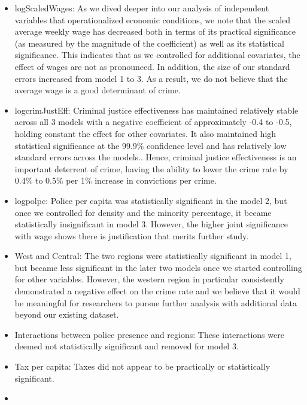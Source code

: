 \documentclass[]{article}
\providecommand{\tightlist}{%
  \setlength{\itemsep}{0pt}\setlength{\parskip}{0pt}}
\begin{document}
\begin{itemize}
\tightlist
\item
  logScaledWages: As we dived deeper into our analysis of independent
  variables that operationalized economic conditions, we note that the
  scaled average weekly wage has decreased both in terms of its
  practical significance (as measured by the magnitude of the
  coefficient) as well as its statistical significance. This indicates
  that as we controlled for additional covariates, the effect of wages
  are not as pronounced. In addition, the size of our standard errors
  increased from model 1 to 3. As a result, we do not believe that the
  average wage is a good determinant of crime.\\
\item
  logcrimJustEff: Criminal justice effectiveness has maintained
  relatively stable across all 3 models with a negative coefficient of
  approximately -0.4 to -0.5, holding constant the effect for other
  covariates. It also maintained high statistical significance at the
  99.9\% confidence level and has relatively low standard errors across
  the models.. Hence, criminal justice effectiveness is an important
  deterrent of crime, having the ability to lower the crime rate by
  0.4\% to 0.5\% per 1\% increase in convictions per crime.\\
\item
  logpolpc: Police per capita was statistically significant in the model
  2, but once we controlled for density and the minority percentage, it
  became statistically insignificant in model 3. However, the higher
  joint significance with wage shows there is justification that merits
  further study.
\item
  West and Central: The two regions were statistically significant in
  model 1, but became less significant in the later two models once we
  started controlling for other variables. However, the western region
  in particular consistently demonstrated a negative effect on the crime
  rate and we believe that it would be meaningful for researchers to
  pursue further analysis with additional data beyond our existing
  dataset.\\
\item
  Interactions between police presence and regions: These interactions
  were deemed not statistically significant and removed for model 3.
\item
  Tax per capita: Taxes did not appear to be practically or
  statistically significant.
\item

\end{itemize}
\end{document}

